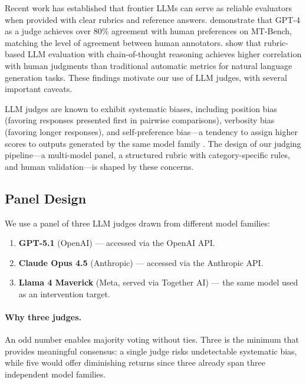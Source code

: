 Recent work has established that frontier LLMs can serve as reliable evaluators when provided with clear rubrics and reference answers. \citet{zheng2023judging} demonstrate that GPT-4 as a judge achieves over 80\% agreement with human preferences on MT-Bench, matching the level of agreement between human annotators. \citet{liu2023geval} show that rubric-based LLM evaluation with chain-of-thought reasoning achieves higher correlation with human judgments than traditional automatic metrics for natural language generation tasks. These findings motivate our use of LLM judges, with several important caveats.

LLM judges are known to exhibit systematic biases, including position bias (favoring responses presented first in pairwise comparisons), verbosity bias (favoring longer responses), and self-preference bias---a tendency to assign higher scores to outputs generated by the same model family \citep{wataoka2024selfpreference}. The design of our judging pipeline---a multi-model panel, a structured rubric with category-specific rules, and human validation---is shaped by these concerns.

\subsection{Panel Design}
\label{sec:panel}

We use a panel of three LLM judges drawn from different model families:

\begin{enumerate}
    \item \textbf{GPT-5.1} (OpenAI) --- accessed via the OpenAI API.
    \item \textbf{Claude Opus 4.5} (Anthropic) --- accessed via the Anthropic API.
    \item \textbf{Llama 4 Maverick} (Meta, served via Together AI) --- the same model used as an intervention target.
\end{enumerate}

\paragraph{Why three judges.} An odd number enables majority voting without ties. Three is the minimum that provides meaningful consensus: a single judge risks undetectable systematic bias, while five would offer diminishing returns since three already span three independent model families.

